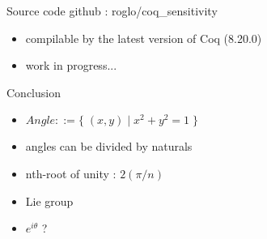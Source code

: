 \documentclass{beamer}
\begin{document}
\begin{frame}{Source code}
  github : roglo/coq\_sensitivity \\
  \begin{itemize}
  \item compilable by the latest version of Coq (8.20.0)
  \item work in progress...
  \end{itemize}
\end{frame}

\begin{frame}{Conclusion}
    \begin{itemize}
    \item $Angle ::= \{ \; (x, y) \; | \; x^2+y^2=1 \; \}$
    \item angles can be divided by naturals
    \end{itemize}
    \vspace{3mm}
    \begin{itemize}
    \item nth-root of unity : $2(\pi / n)$
    \item Lie group
    \item $e^{i \theta}$ ?
    \end{itemize}
\end{frame}
\end{document}
